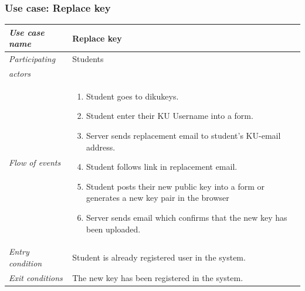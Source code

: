 \documentclass[11pt,a4paper]{report}
\begin{document}
\subsubsection{Use case: Replace key}
\begin{tabular}{l p{}}
    \toprule
    \textit{Use case name} & Replace key \\
    \midrule
    \textit{Participating} & Students \\
    \textit{actors} & \\
    \midrule
    \textit{Flow of events} &
    \vspace{-6.7mm} \begin{enumerate}
        \item Student goes to dikukeys.
        \item Student enter their KU Username into a form.
        \item Server sends replacement email to student's KU-email address.
        \item Student follows link in replacement email.
        \item Student posts their new public key into a form or generates a new key pair in the browser
        \item Server sends email which confirms that the new key has been uploaded.
    \end{enumerate}
    \\
    \midrule
    \textit{Entry condition} & Student is already registered user in the system. \\
    \midrule
    \textit{Exit conditions} & The new key has been registered in the system. \\
    \bottomrule
\end{tabular}
\end{document}
